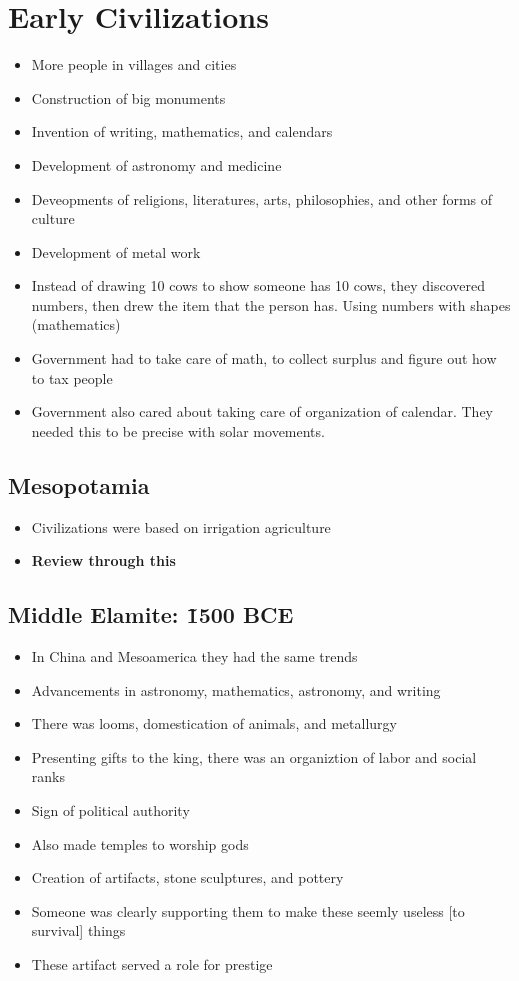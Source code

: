 \documentclass{article}
\begin{document}
\section{Early Civilizations}
\begin{itemize}
  \item More people in villages and cities
  \item Construction of big monuments
  \item Invention of writing, mathematics, and calendars
  \item Development of astronomy and medicine
  \item Deveopments of religions, literatures, arts, philosophies,
    and other forms of culture
  \item Development of metal work
  \item Instead of drawing 10 cows to show someone has 10 cows,
    they discovered numbers, then drew the item that the person has.
    Using numbers with shapes (mathematics)
  \item Government had to take care of math,
    to collect surplus and figure out how to tax people
  \item Government also cared about taking care of organization
    of calendar. They needed this to be precise with solar movements.
\end{itemize}

\subsection{Mesopotamia}
\begin{itemize}
  \item Civilizations were based on irrigation agriculture
  \item \textbf{Review through this}
\end{itemize}

\subsection{Middle Elamite: \~1500 BCE}
\begin{itemize}
  \item In China and Mesoamerica they had the same trends
  \item Advancements in astronomy, mathematics, astronomy, and writing
  \item There was looms, domestication of animals, and
    metallurgy
  \item Presenting gifts to the king, there was an
    organiztion of labor and social ranks
  \item Sign of political authority
  \item Also made temples to worship gods
  \item Creation of artifacts, stone sculptures, and pottery
  \item Someone was clearly supporting them to make these
    seemly useless [to survival] things
  \item These artifact served a role for prestige
\end{itemize}
\end{document}

